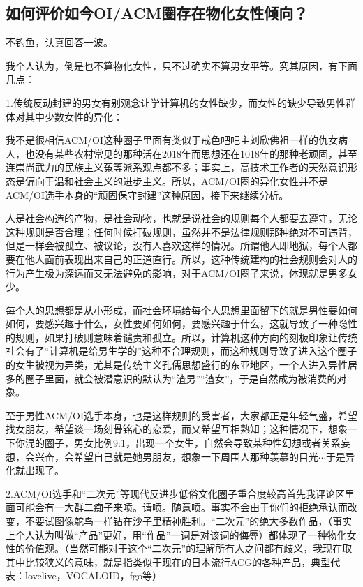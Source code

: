 \documentclass{ctexart}
\begin{document}
	\subsection{如何评价如今OI/ACM圈存在物化女性倾向？}
	
	不钓鱼，认真回答一波。
	
	我个人认为，倒是也不算物化女性，只不过确实不算男女平等。究其原因，有下面几点：
	
	1.传统反动封建的男女有别观念让学计算机的女性缺少，而女性的缺少导致男性群体对其中少数女性的异化：
	
	我不是很相信ACM/OI这种圈子里面有类似于戒色吧吧主刘欣佛祖一样的仇女病人，也没有某些农村常见的那种活在2018年而思想还在1018年的那种老顽固，甚至连崇尚武力的民族主义菟等派系观点都不多；事实上，高技术工作者的天然意识形态是偏向于温和社会主义的进步主义。所以，ACM/OI圈的异化女性并不是ACM/OI选手本身的“顽固保守封建”这种原因，接下来继续分析。
	
	人是社会构造的产物，是社会动物，也就是说社会的规则每个人都要去遵守，无论这种规则是否合理；任何时候打破规则，虽然并不是法律规则那种绝对不可违背，但是一样会被孤立、被议论，没有人喜欢这样的情况。所谓他人即地狱，每个人都要在他人面前表现出来自己的正道直行。所以，这种传统建构的社会规则会对人的行为产生极为深远而又无法避免的影响，对于ACM/OI圈子来说，体现就是男多女少。
	
	每个人的思想都是从小形成，而社会环境给每个人思想里面留下的就是男性要如何如何，要感兴趣于什么，女性要如何如何，要感兴趣于什么，这就导致了一种隐性的规则，如果打破则意味着谴责和孤立。所以，计算机这种方向的刻板印象让传统社会有了“计算机是给男生学的”这种不合理规则，而这种规则导致了进入这个圈子的女生被视为异类，尤其是传统主义孔儒思想盛行的东亚地区，一个人进入异性居多的圈子里面，就会被潜意识的默认为“渣男”“渣女”，于是自然成为被消费的对象。
	
	至于男性ACM/OI选手本身，也是这样规则的受害者，大家都正是年轻气盛，希望找女朋友，希望谈一场刻骨铭心的恋爱，而又希望互相熟知；这种情况下，想象一下你混的圈子，男女比例9:1，出现一个女生，自然会导致某种性幻想或者关系妄想，会兴奋，会希望自己就是她男朋友，想象一下周围人那种羡慕的目光$\cdots$于是异化就出现了。
	
	2.ACM/OI选手和“二次元”等现代反进步低俗文化圈子重合度较高首先我评论区里面可能会有一大群二痴子来喷。请喷。随意喷。事实不会由于你们的拒绝承认而改变，不要试图像鸵鸟一样钻在沙子里精神胜利。“二次元”的绝大多数作品，（事实上个人认为叫做“产品”更好，用“作品”一词是对该词的侮辱）都体现了一种物化女性的价值观。（当然可能对于这个“二次元”的理解所有人之间都有歧义，我现在取其中比较狭义的意味，就是指类似于现在的日本流行ACG的各种产品，典型代表：lovelive，VOCALOID，fgo等）
	
\end{document}
